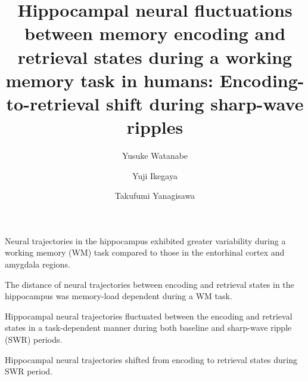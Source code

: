 \documentclass[final,3p,times,twocolumn]{elsarticle}
\begin{document}
\begin{frontmatter}
\begin{highlights}

\item Neural trajectories in the hippocampus exhibited greater variability during a working memory (WM) task compared to those in the entorhinal cortex and amygdala regions.

\item The distance of neural trajectories between encoding and retrieval states in the hippocampus was memory-load dependent during a WM task.


\item Hippocampal neural trajectories fluctuated between the encoding and retrieval states in a task-dependent manner during both baseline and sharp-wave ripple (SWR) periods.

\item Hippocampal neural trajectories shifted from encoding to retrieval states during SWR period.

\end{highlights}\title{
Hippocampal neural fluctuations between memory encoding and retrieval states during a working memory task in humans: Encoding-to-retrieval shift during sharp-wave ripples
}

\author[1]{Yusuke Watanabe}
\author[2,3,4]{Yuji Ikegaya}
\author[1,5]{Takufumi Yanagisawa}

\address[1]{Institute for Advanced Cocreation studies, Osaka University, 2-2 Yamadaoka, Suita, 565-0871, Osaka, Japan}
\address[2]{Graduate School of Pharmaceutical Sciences, The University of Tokyo, 7-3-1 Hongo, Tokyo, 113-0033, Japan}
\address[3]{Institute for AI and Beyond, The University of Tokyo, 7-3-1 Hongo, Tokyo, 113-0033, Japan}
\address[4]{Center for Information and Neural Networks, National Institute of Information and Communications Technology, 1-4 Yamadaoka, Suita City, 565-0871, Osaka, Japan}
\address[5]{Department of Neurosurgery, Osaka University Graduate School of Medicine, 2-2 Yamadaoka, Osaka, 565-0871, Japan}


\end{frontmatter}
\end{document}
